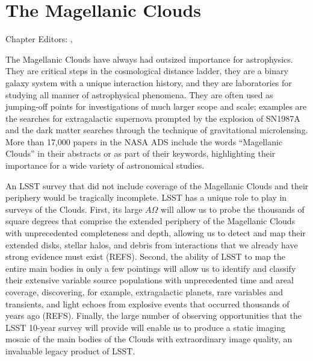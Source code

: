 
\chapter{The Magellanic Clouds}
\def\chpname{MCs}\label{chp:\chpname}

Chapter Editors:
,

The Magellanic Clouds have always had outsized importance for
astrophysics.  They are critical steps in the cosmological distance
ladder, they are a binary galaxy system with a unique interaction
history, and they are laboratories for studying all manner of
astrophysical phenomena.  They are often used as jumping-off points
for investigations of much larger scope and scale; examples are the
searches for extragalactic supernova prompted by the explosion of
SN1987A and the dark matter searches through the technique of
gravitational microlensing.  More than 17,000 papers in the NASA ADS
include the words ``Magellanic Clouds'' in their abstracts or as part
of their keywords, highlighting their importance for a wide variety of
astronomical studies.

An LSST survey that did not include coverage of the Magellanic Clouds
and their periphery would be tragically incomplete.  LSST has a unique
role to play in surveys of the Clouds.  First, its large $A\Omega$
will allow us to probe the thousands of square degrees that comprise
the extended periphery of the Magellanic Clouds with unprecedented
completeness and depth, allowing us to detect and map their extended
disks, stellar halos, and debris from interactions that we already
have strong evidence must exist (REFS).  Second, the ability of LSST
to map the entire main bodies in only a few pointings will allow us to
identify and classify their extensive variable source populations with
unprecedented time and areal coverage, discovering, for example,
extragalactic planets, rare variables and transients, and light echoes
from explosive events that occurred thousands of years ago (REFS).
Finally, the large number of observing opportunities that the LSST
10-year survey will provide will enable us to produce a static imaging
mosaic of the main bodies of the Clouds with extraordinary image
quality, an invaluable legacy product of LSST.

